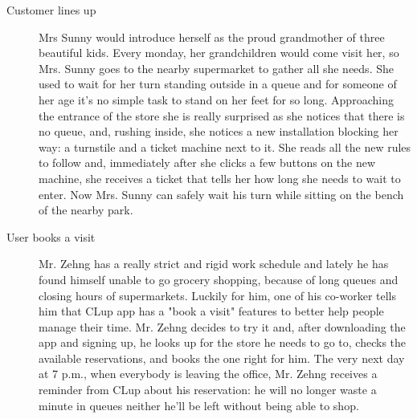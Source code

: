 \begin{description}
    \item[Customer lines up]
    Mrs Sunny would introduce herself as the proud grandmother of three beautiful kids.   
    Every monday, her grandchildren would come visit her, so  Mrs. Sunny goes to the nearby supermarket to gather all she needs. She used to wait for her turn standing outside in a queue and for someone of her age it's no simple task to stand on her feet for so long. Approaching the entrance of the store she is really surprised as she notices that there is no queue, and, rushing inside, she notices a new installation blocking her way: a turnstile and a ticket machine next to it. She reads all the new rules to follow and, immediately after she clicks a few buttons on the new machine, she receives a ticket that tells her how long she needs to wait to enter. Now Mrs. Sunny can safely wait his turn while sitting on the bench of the nearby park. 


    \item[User books a visit]
    Mr. Zehng  has a really strict and rigid work schedule and lately he has found himself unable to go grocery shopping, because of long queues and closing hours of supermarkets. Luckily for him, one of his co-worker tells him that CLup app has a "book a visit" features to better help people manage their time. Mr. Zehng decides to try it and, after downloading the app and signing up, he looks up for the store he needs to go to, checks the available reservations, and books the one right for him. The very next day at 7 p.m., when everybody is leaving the office, Mr. Zehng receives a reminder from CLup about his reservation: he will no longer waste a minute in queues neither he'll be left without being able to shop.


\end{description}
